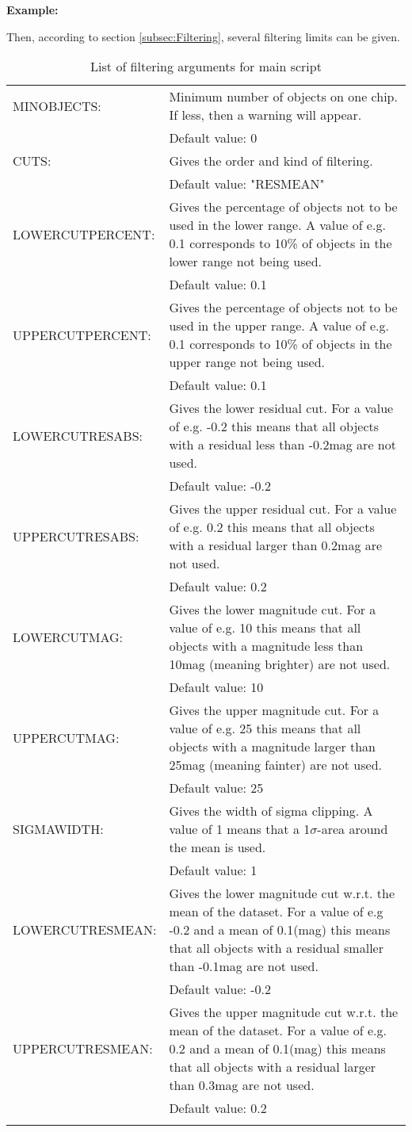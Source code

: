 \textbf{Example:} 

Then, according to section \ref{subsec:Filtering}, several filtering limits can be given.
\begin{longtable}{lp{9.5cm}}
MINOBJECTS: & Minimum number of objects on one chip. If less, then a warning will appear.\\
 & Default value: 0\\
CUTS: & Gives the order and kind of filtering.\\
 & Default value: "RESMEAN"\\
LOWERCUTPERCENT: & Gives the percentage of objects not to be used in the lower range. A value of e.g. 0.1 corresponds to 10\% of objects in the lower range not being used.\\
 & Default value: 0.1\\
UPPERCUTPERCENT: & Gives the percentage of objects not to be used in the upper range. A value of e.g. 0.1 corresponds to 10\% of objects in the upper range not being used.\\
 & Default value: 0.1\\
LOWERCUTRESABS: & Gives the lower residual cut. For a value of e.g. -0.2 this means that all objects with a residual less than -0.2mag are not used.\\
 & Default value: -0.2\\
UPPERCUTRESABS: & Gives the upper residual cut. For a value of e.g. 0.2 this means that all objects with a residual larger than 0.2mag are not used.\\
 & Default value: 0.2\\
LOWERCUTMAG: & Gives the lower magnitude cut. For a value of e.g. 10 this means that all objects with a magnitude less than 10mag (meaning brighter) are not used.\\
 & Default value: 10\\
UPPERCUTMAG: & Gives the upper magnitude cut. For a value of e.g. 25 this means that all objects with a magnitude larger than 25mag (meaning fainter) are not used.\\
 & Default value: 25\\
SIGMAWIDTH: & Gives the width of sigma clipping. A value of 1 means that a 1$\sigma$-area around the mean is used.\\
 & Default value: 1\\
LOWERCUTRESMEAN: & Gives the lower magnitude cut w.r.t. the mean of the dataset. For a value of e.g -0.2 and a mean of 0.1(mag) this means that all objects with a residual smaller than -0.1mag are not used.\\
 & Default value: -0.2\\
UPPERCUTRESMEAN: & Gives the upper magnitude cut w.r.t. the mean of the dataset. For a value of e.g. 0.2 and a mean of 0.1(mag) this means that all objects with a residual larger than 0.3mag are not used.\\
 & Default value: 0.2\\
\caption{List of filtering arguments for main script}
\label{tab:FilteringArgumentsMainScript}
\end{longtable}

